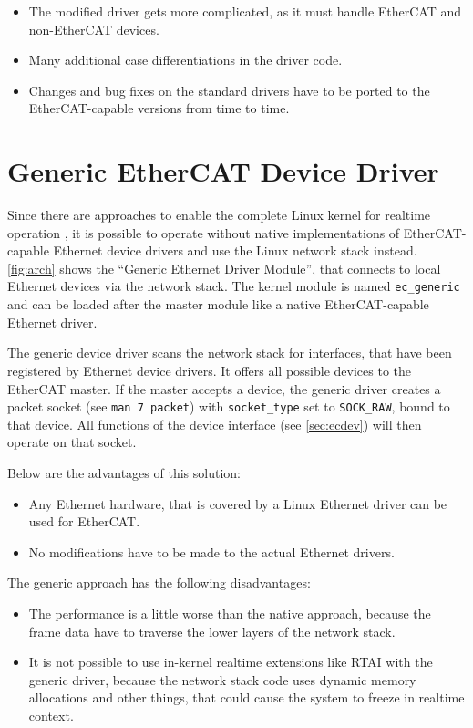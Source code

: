 \documentclass[a4paper,12pt,BCOR=6mm,bibtotoc,idxtotoc]{scrbook}
\begin{document}
\begin{itemize}
\item The modified driver gets more complicated, as it must handle
  EtherCAT and non-EtherCAT devices.
\item Many additional case differentiations in the driver code.
\item Changes and bug fixes on the standard drivers have to be ported
  to the Ether\-CAT-capable versions from time to time.
\end{itemize}


\section{Generic EtherCAT Device Driver}
\label{sec:generic-driver}

Since there are approaches to enable the complete Linux kernel for realtime
operation \cite{rt-preempt}, it is possible to operate without native
implementations of EtherCAT-capable Ethernet device drivers and use the Linux
network stack instead. \autoref{fig:arch} shows the ``Generic Ethernet Driver
Module'', that connects to local Ethernet devices via the network stack. The
kernel module is named \lstinline+ec_generic+ and can be loaded after the
master module like a native EtherCAT-capable Ethernet driver.

The generic device driver scans the network stack for interfaces, that have
been registered by Ethernet device drivers. It offers all possible devices to
the EtherCAT master. If the master accepts a device, the generic driver
creates a packet socket (see \lstinline+man 7 packet+) with
\lstinline+socket_type+ set to \lstinline+SOCK_RAW+, bound to that device. All
functions of the device interface (see \autoref{sec:ecdev}) will then operate
on that socket.

Below are the advantages of this solution:

\begin{itemize}
\item Any Ethernet hardware, that is covered by a Linux Ethernet driver can be
used for EtherCAT.
\item No modifications have to be made to the actual Ethernet drivers.
\end{itemize}

The generic approach has the following disadvantages:

\begin{itemize}
\item The performance is a little worse than the native approach, because the
frame data have to traverse the lower layers of the network stack.
\item It is not possible to use in-kernel realtime extensions like RTAI with
the generic driver, because the network stack code uses dynamic memory
allocations and other things, that could cause the system to freeze in
realtime context.
\end{itemize}
\end{document}
